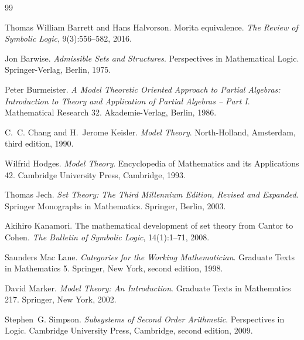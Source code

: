 {\small
\begin{thebibliography}{99}

Thomas William Barrett and Hans Halvorson.
\newblock Morita equivalence.
\newblock \emph{The Review of Symbolic Logic}, 9(3):556--582, 2016.

Jon Barwise.
\newblock \emph{Admissible Sets and Structures}.
\newblock Perspectives in Mathematical Logic. Springer-Verlag, Berlin, 1975.

Peter Burmeister.
\newblock \emph{A Model Theoretic Oriented Approach to Partial Algebras: Introduction to Theory and Application of Partial Algebras -- Part I}.
\newblock Mathematical Research 32. Akademie-Verlag, Berlin, 1986.

C.~C. Chang and H.~Jerome Keisler.
\newblock \emph{Model Theory}.
\newblock North-Holland, Amsterdam, third edition, 1990.

Wilfrid Hodges.
\newblock \emph{Model Theory}.
\newblock Encyclopedia of Mathematics and its Applications 42. Cambridge University Press, Cambridge, 1993.

Thomas Jech.
\newblock \emph{Set Theory: The Third Millennium Edition, Revised and Expanded}.
\newblock Springer Monographs in Mathematics. Springer, Berlin, 2003.

Akihiro Kanamori.
\newblock The mathematical development of set theory from {Cantor} to {Cohen}.
\newblock \emph{The Bulletin of Symbolic Logic}, 14(1):1--71, 2008.

Saunders Mac Lane.
\newblock \emph{Categories for the Working Mathematician}.
\newblock Graduate Texts in Mathematics 5. Springer, New York, second edition, 1998.

David Marker.
\newblock \emph{Model Theory: An Introduction}.
\newblock Graduate Texts in Mathematics 217. Springer, New York, 2002.

Stephen~G. Simpson.
\newblock \emph{Subsystems of Second Order Arithmetic}.
\newblock Perspectives in Logic. Cambridge University Press, Cambridge, second edition, 2009.

\end{thebibliography}

}\normalsize
